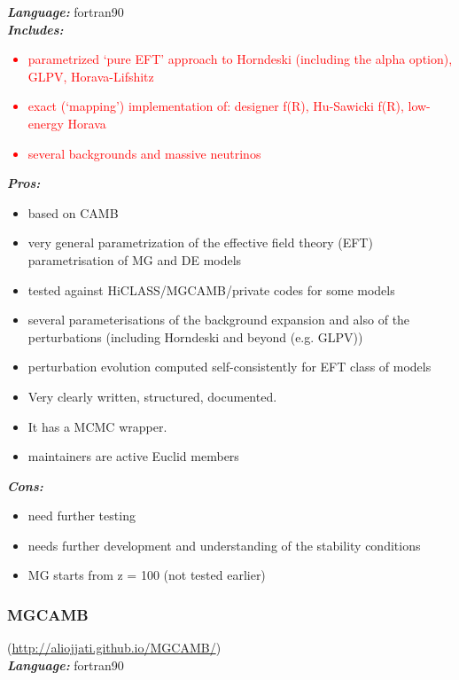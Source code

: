 {\it \bf Language:} fortran90\\

{\it \bf Includes:}\\
\textcolor{red}{
\begin{itemize}
\item parametrized ‘pure EFT’ approach to Horndeski (including the alpha option), GLPV, 
      Horava-Lifshitz 
\item exact (‘mapping’) implementation of: designer f(R), Hu-Sawicki f(R), low-energy Horava
\item several backgrounds and massive neutrinos
\end{itemize}
}

{\it \bf Pros:}
\begin{itemize}
 \item based on CAMB
 \item very general parametrization of the effective field theory (EFT) parametrisation of MG and DE models
 \item tested against HiCLASS/MGCAMB/private codes for some models
 \item several parameterisations of the background expansion and also of the perturbations (including Horndeski and beyond (e.g. GLPV))
 \item perturbation evolution computed self-consistently for EFT class of models
 \item Very clearly written, structured, documented. 
 \item It has a MCMC wrapper.
 \item maintainers are active Euclid members
\end{itemize}

{\it \bf Cons: }
\begin{itemize}
 \item need further testing
 \item needs further development and understanding of the stability conditions
 \item MG starts from z = 100 (not tested earlier)
\end{itemize}

\newpage
\subsubsection{MGCAMB}(\url{http://aliojjati.github.io/MGCAMB/})\\

{\it \bf Language:} fortran90\\

